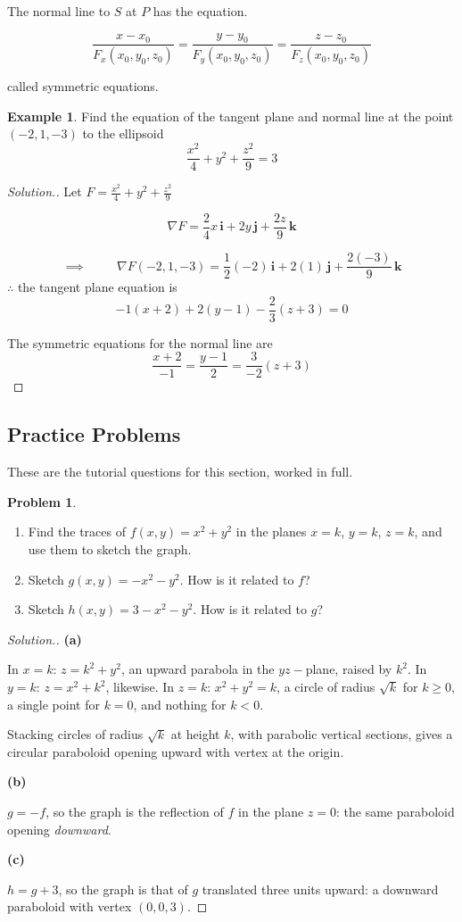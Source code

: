 \documentclass[11pt,a4paper]{article}
\theoremstyle{definition}
\newtheorem{exa}[thm]{Example}
\newtheorem{problemx}{Problem}[subsection]
\newenvironment{problem}{\begin{problemx}}{\end{problemx}}
\newenvironment{solution}
  {\renewcommand{\qedsymbol}{}\begin{proof}[\textit{Solution}.]}
  {\end{proof}}
\newcommand{\subhead}[1]{%
  \par\medskip\noindent\textbf{#1}\par\nobreak\smallskip}
\begin{document}
The normal line to $S$ at $P$ has the equation.

$$ \frac{x - x_0}{F_x (x_0, y_0, z_0)}  = \frac{y - y_0}{F_y (x_0, y_0, z_0)} = \frac{z - z_0}{F_z (x_0, y_0, z_0)} $$

called symmetric equations.


\begin{exa}


Find the equation of the tangent plane and normal line at the point $(-2,1,-3)$ to the ellipsoid $$\frac{x^2}{4} + y^2 + \frac{z^2}{9} =3$$
\end{exa}


\begin{solution}


Let $\displaystyle{F = \frac{x^2}{4} + y^2 + \frac{z^2}{9}}$

$$\nabla F = \frac{2}{4}x\,\textbf{i} + 2y\,\textbf{j} + \frac{2z}{9}\,\textbf{k}$$

$$\implies\hspace{1cm} \nabla F( -2,1,-3) = \frac{1}{2}(-2)\,\textbf{i} + 2(1)\,\textbf{j} + \frac{2(-3)}{9}\,\textbf{k}$$
$\therefore$ the tangent plane equation is 
$$-1(x+2) + 2(y-1) -\frac{2}{3}(z + 3) = 0$$

The symmetric equations for the normal line are 
$$\frac{x + 2}{-1} = \frac{y - 1}{2} = \frac{3}{-2}(z + 3)$$


\pagebreak
\end{solution}

\subsection{Practice Problems}

These are the tutorial questions for this section, worked in full.

\begin{problem}
\begin{enumerate}
\item[(a)] Find the traces of $f(x,y) = x^2+y^2$ in the planes $x=k$, $y=k$,
$z=k$, and use them to sketch the graph.
\item[(b)] Sketch $g(x,y) = -x^2-y^2$. How is it related to $f$?
\item[(c)] Sketch $h(x,y) = 3-x^2-y^2$. How is it related to $g$?
\end{enumerate}
\end{problem}
\begin{solution}
\subhead{(a)}
In $x=k$: $z = k^2+y^2$, an upward parabola in the $yz-$plane, raised by $k^2$.
In $y=k$: $z = x^2+k^2$, likewise. In $z=k$: $x^2+y^2 = k$, a circle of radius
$\sqrt k$ for $k\geq 0$, a single point for $k=0$, and nothing for $k<0$.

Stacking circles of radius $\sqrt k$ at height $k$, with parabolic vertical
sections, gives a circular paraboloid opening upward with vertex at the origin.

\subhead{(b)}
$g = -f$, so the graph is the reflection of $f$ in the plane $z=0$: the same
paraboloid opening \emph{downward}.

\subhead{(c)}
$h = g+3$, so the graph is that of $g$ translated three units upward: a
downward paraboloid with vertex $(0,0,3)$.
\end{solution}
\end{document}
